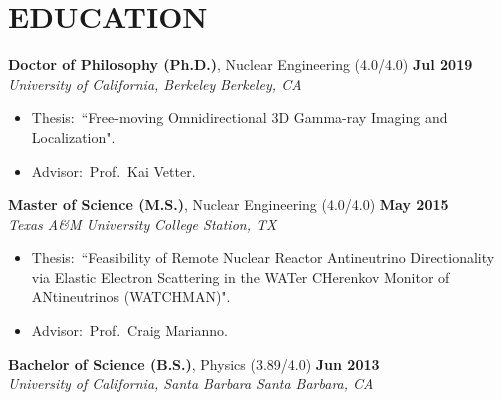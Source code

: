 \section{\small{EDUCATION}}

\textbf{Doctor of Philosophy (Ph.D.)}, Nuclear Engineering (4.0/4.0) \hfill \textbf{Jul 2019} \\
\textsl{University of California, Berkeley} \hfill \textsl{Berkeley, CA}\\[-2.8ex]
\begin{itemize}[leftmargin=4ex] \itemsep -2pt
\item Thesis:~``Free-moving Omnidirectional 3D Gamma-ray Imaging and Localization".
\item Advisor:~Prof.~Kai Vetter.
\end{itemize}
\vspace{-5pt}

\textbf{Master of Science (M.S.)}, Nuclear Engineering (4.0/4.0) \hfill \textbf{May 2015} \\
\textsl{Texas A\&M University} \hfill \textsl{College Station, TX}\\[-2.8ex]
\begin{itemize}[leftmargin=4ex] \itemsep -2pt
\item Thesis:~``Feasibility of Remote Nuclear Reactor Antineutrino Directionality via Elastic Electron Scattering in the WATer CHerenkov Monitor of ANtineutrinos (WATCHMAN)".
\item Advisor:~Prof.~Craig Marianno.
\end{itemize}
\vspace{-5pt}

\textbf{Bachelor of Science (B.S.)}, Physics (3.89/4.0) \hfill \textbf{Jun 2013} \\
\textsl{University of California, Santa Barbara} \hfill \textsl{Santa Barbara, CA}\\[-2.8ex]
